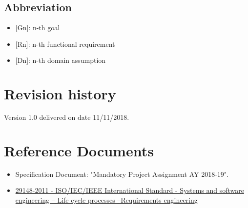 \subsection{Abbreviation}
\begin{itemize}
    \item {[Gn]}: n-th goal
    \item {[Rn]}: n-th functional requirement
    \item {[Dn]}: n-th domain assumption
\end{itemize}

\section{Revision history}
Version 1.0 delivered on date 11/11/2018.

\section{Reference Documents}
\begin{itemize}
    \item Specification Document: "Mandatory Project Assignment AY 2018-19". 
    \item \href{https://ieeexplore.ieee.org/document/6146379} {29148-2011 - ISO/IEC/IEEE International Standard - Systems and software engineering -- Life cycle processes --Requirements engineering}
\end{itemize}

